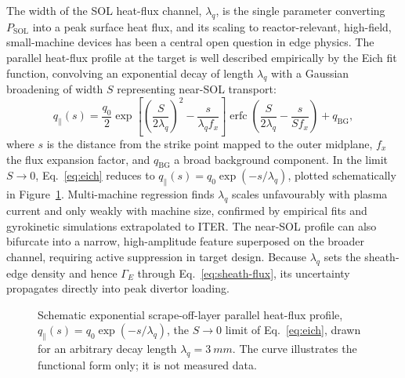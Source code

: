 The width of the SOL heat-flux channel, $\lambda_{q}$, is the single parameter converting $P_{\mathrm{SOL}}$ into a peak surface heat flux, and its scaling to reactor-relevant, high-field, small-machine devices has been a central open question in edge physics. The parallel heat-flux profile at the target is well described empirically by the Eich fit function, convolving an exponential decay of length $\lambda_{q}$ with a Gaussian broadening of width $S$ representing near-SOL transport:
\begin{equation}
q_{\parallel}(s) = \frac{q_{0}}{2}\exp\!\left[\left(\frac{S}{2\lambda_{q}}\right)^{2} - \frac{s}{\lambda_{q} f_{x}}\right] \operatorname{erfc}\!\left(\frac{S}{2\lambda_{q}} - \frac{s}{S f_{x}}\right) + q_{\mathrm{BG}},
\label{eq:eich}
\end{equation}
where $s$ is the distance from the strike point mapped to the outer midplane, $f_{x}$ the flux expansion factor, and $q_{\mathrm{BG}}$ a broad background component. In the limit $S \to 0$, Eq.~\eqref{eq:eich} reduces to $q_{\parallel}(s) = q_{0}\exp(-s/\lambda_{q})$, plotted schematically in Figure~\ref{fig:sol-heatflux}. Multi-machine regression finds $\lambda_{q}$ scales unfavourably with plasma current and only weakly with machine size, confirmed by empirical fits and gyrokinetic simulations extrapolated to ITER. The near-SOL profile can also bifurcate into a narrow, high-amplitude feature superposed on the broader channel, requiring active suppression in target design. Because $\lambda_{q}$ sets the sheath-edge density and hence $\Gamma_{E}$ through Eq.~\eqref{eq:sheath-flux}, its uncertainty propagates directly into peak divertor loading.

\begin{figure}[htbp]
\centering
{}
\caption{Schematic exponential scrape-off-layer parallel heat-flux profile, $q_{\parallel}(s) = q_{0}\exp(-s/\lambda_{q})$, the $S \to 0$ limit of Eq.~\eqref{eq:eich}, drawn for an arbitrary decay length $\lambda_{q} = \SI{3}{mm}$. The curve illustrates the functional form only; it is not measured data.}
\label{fig:sol-heatflux}
\end{figure}

